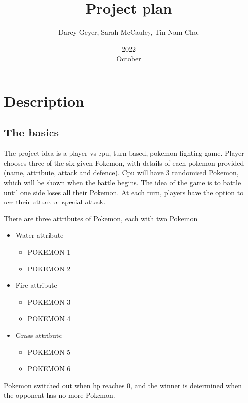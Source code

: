 \documentclass{article}
\title{Project plan}
\author{Darcy Geyer, Sarah McCauley, Tin Nam Choi}
\date{2022\\October}
\begin{document}
  \maketitle{}
  
  \tableofcontents{}
  \setlength{\parindent}{0em}
  \setlength{\parskip}{1em}
  
  \pagebreak
  
  \section{Description}
  
  \subsection{The basics}
  The project idea is a player-vs-cpu, turn-based, pokemon fighting game. Player chooses three of the six given Pokemon, with details of each pokemon provided (name, attribute, attack and defence). Cpu will have 3 randomised Pokemon, which will be shown when the battle begins. The idea of the game is to battle until one side loses all their Pokemon. At each turn, players have the option to use their attack or special attack. \par
  There are three attributes of Pokemon, each with two Pokemon:
  \begin{itemize}
    \item Water attribute
    \begin{itemize}
      \item POKEMON 1
      \item POKEMON 2
    \end{itemize}
    \item Fire attribute
    \begin{itemize}
      \item POKEMON 3
      \item POKEMON 4
    \end{itemize}
    \item Grass attribute
    \begin{itemize}
      \item POKEMON 5
      \item POKEMON 6
    \end{itemize}
  \end{itemize}
    
  Pokemon switched out when hp reaches 0, and the winner is determined when the opponent has no more Pokemon. \\
  
\end{document}
